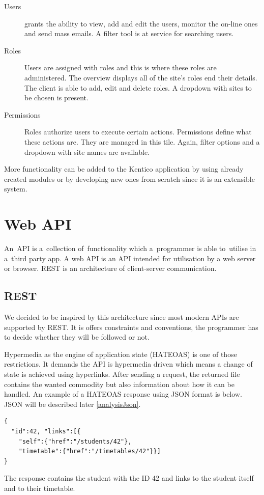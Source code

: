 \begin{description}
\begin {description}
	\item [Users] grants the ability to view, add and edit the users, monitor the on-line ones and send mass emails. A filter tool is at service for searching users.
	\item [Roles] Users are assigned with roles and this is where these roles are administered. The overview displays all of the site's roles end their details. The client is able to add, edit and delete roles. A dropdown with sites to be chosen is present. 
	\item [Permissions] Roles authorize users to execute certain actions. Permissions define what these actions are. They are managed in this tile. Again, filter options and a dropdown with site names are available. 
	\end{description}
\end{description}
More functionality can be added to the Kentico application by using already created modules or by developing new ones from scratch since it is an extensible system.

\section{Web API} \label{analysisWebAPI}
An~API is a~collection of~functionality which a~programmer is able to~utilise in a~third party app. A web API is an API intended for utilisation by a web server or browser. REST is an architecture of client-server communication. 
\subsection{REST} \label{analysisREST} \cite{rest}
We decided to be inspired by this architecture since most modern APIs are supported by REST. It is offers constraints and conventions, the programmer has to decide whether they will be followed or not. 

\cite{hateoas} Hypermedia as the engine of application state (HATEOAS) is one of those restrictions. It demands the API is hypermedia driven which means a change of state is achieved using hyperlinks. After sending a request, the returned file contains the wanted commodity but also information about how it can be handled. An example of a HATEOAS response using JSON format is below. JSON will be described later \ref{analysisJson}.
\lstset{style=sharpc, numbers=none}
\begin{lstlisting}
{
  "id":42, "links":[{ 
	"self":{"href":"/students/42"}, 
	"timetable":{"href":"/timetables/42"}}]
}
\end{lstlisting}
The response contains the student with the ID 42 and links to the student itself and to their timetable. 

